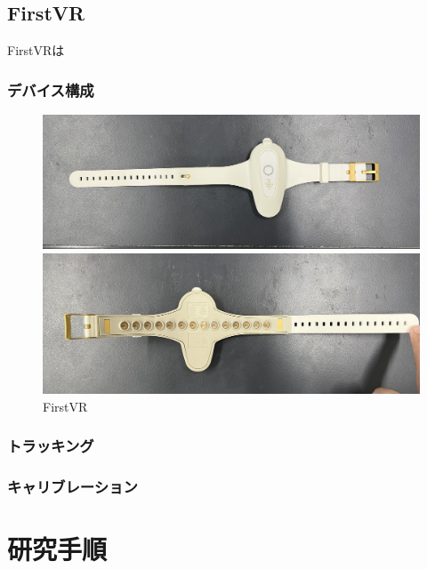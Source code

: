 \documentclass{ltjsreport}
\begin{document}
	\section{FirstVR}
		FirstVRは
		\subsection{デバイス構成}
				\begin{figure}[H]
				\centering
				\begin{minipage}{0.75\columnwidth}
				\centering
				\includegraphics[width = \columnwidth]{../figs/IMG_5130.JPG}
				\end{minipage}
				\hspace{0.04\columnwidth}
				\begin{minipage}{0.75\columnwidth}
				\centering
				\includegraphics[width = \columnwidth]{../figs/IMG_5131.JPG}
				\end{minipage}
				\caption{FirstVR}
				\end{figure}
		\subsection{トラッキング}
		\subsection{キャリブレーション}
	
\chapter{研究手順}
\end{document}
